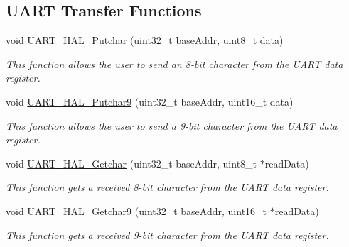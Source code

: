 \subsection*{U\+A\+RT Transfer Functions}
\begin{DoxyCompactItemize}
\item 
void \hyperlink{group__uart__hal_ga4e3a567f40dcded77abb8f9af9003014}{U\+A\+R\+T\+\_\+\+H\+A\+L\+\_\+\+Putchar} (uint32\+\_\+t base\+Addr, uint8\+\_\+t data)
\begin{DoxyCompactList}\small\item\em This function allows the user to send an 8-\/bit character from the U\+A\+RT data register. \end{DoxyCompactList}\item 
void \hyperlink{group__uart__hal_ga06c962d1f9173c5edc3d2f94a5b986e1}{U\+A\+R\+T\+\_\+\+H\+A\+L\+\_\+\+Putchar9} (uint32\+\_\+t base\+Addr, uint16\+\_\+t data)
\begin{DoxyCompactList}\small\item\em This function allows the user to send a 9-\/bit character from the U\+A\+RT data register. \end{DoxyCompactList}\item 
void \hyperlink{group__uart__hal_ga6654ad81f78f8f9736fe6d5d99955554}{U\+A\+R\+T\+\_\+\+H\+A\+L\+\_\+\+Getchar} (uint32\+\_\+t base\+Addr, uint8\+\_\+t $\ast$read\+Data)
\begin{DoxyCompactList}\small\item\em This function gets a received 8-\/bit character from the U\+A\+RT data register. \end{DoxyCompactList}\item 
void \hyperlink{group__uart__hal_ga8faaa5dec652f92dfa51d57e24d3889c}{U\+A\+R\+T\+\_\+\+H\+A\+L\+\_\+\+Getchar9} (uint32\+\_\+t base\+Addr, uint16\+\_\+t $\ast$read\+Data)
\begin{DoxyCompactList}\small\item\em This function gets a received 9-\/bit character from the U\+A\+RT data register. \end{DoxyCompactList}\end{DoxyCompactItemize}
